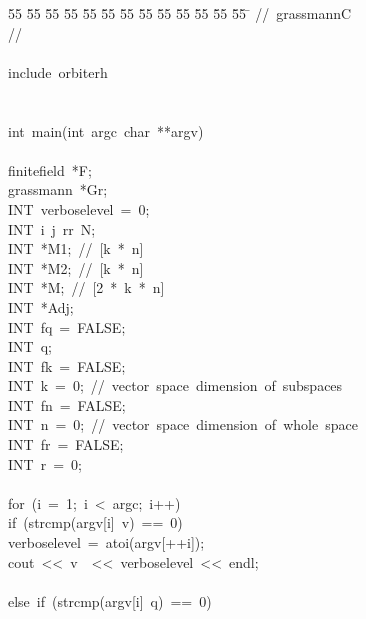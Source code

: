 %
%
\begin{tabbing}
55 \= 55 \= 55 \= 55 \= 55 \= 55 \= 55 \= 55 \= 55 \= 55 \= 55 \= 55 \= 55 \= \kill
//\ grassmannC\\[0pt]
//\ \\[0pt]
\\[0pt]
include\ orbiterh\\[0pt]
\\[0pt]
\\[0pt]
int\ main(int\ argc\ char\ **argv)\\[0pt]
\\[0pt]
\>finitefield\ *F;\\[0pt]
\>grassmann\ *Gr;\\[0pt]
\>INT\ verboselevel\ =\ 0;\\[0pt]
\>INT\ i\ j\ rr\ N;\\[0pt]
\>INT\ *M1;\ //\ [k\ *\ n]\\[0pt]
\>INT\ *M2;\ //\ [k\ *\ n]\\[0pt]
\>INT\ *M;\ //\ [2\ *\ k\ *\ n]\\[0pt]
\>INT\ *Adj;\\[0pt]
\>INT\ fq\ =\ FALSE;\\[0pt]
\>INT\ q;\\[0pt]
\>INT\ fk\ =\ FALSE;\\[0pt]
\>INT\ k\ =\ 0;\ //\ vector\ space\ dimension\ of\ subspaces\\[0pt]
\>INT\ fn\ =\ FALSE;\\[0pt]
\>INT\ n\ =\ 0;\ //\ vector\ space\ dimension\ of\ whole\ space\\[0pt]
\>INT\ fr\ =\ FALSE;\\[0pt]
\>INT\ r\ =\ 0;\\[0pt]
\\[0pt]
\>for\ (i\ =\ 1;\ i\ <\ argc;\ i++)\ \\[0pt]
\>\>if\ (strcmp(argv[i]\ v)\ ==\ 0)\ \\[0pt]
\>\>\>verboselevel\ =\ atoi(argv[++i]);\\[0pt]
\>\>\>cout\ <<\ v\ \ <<\ verboselevel\ <<\ endl;\\[0pt]
\>\>\>\\[0pt]
\>\>else\ if\ (strcmp(argv[i]\ q)\ ==\ 0)\ \\[0pt]

\end{tabbing}
